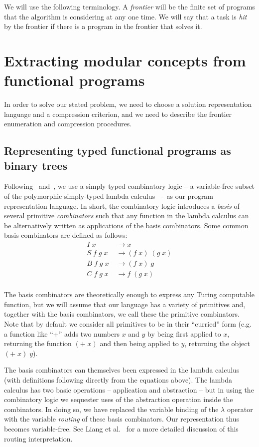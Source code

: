 \documentclass{article}
\begin{document}
We will use the following terminology. A \emph{frontier} will be the
finite set of programs that the algorithm is considering at any one
time. We will say that a task is \emph{hit} by the frontier if there
is a program in the frontier that solves it. 

\section{Extracting modular concepts from functional programs}

In order to solve our stated problem, we need to choose a solution
representation language and a compression criterion, and we need to
describe the frontier enumeration and compression procedures.

\subsection{Representing typed functional programs as binary trees}

Following~\cite{liang10programs} and~\cite{Briggs:2008}, we use a
simply typed combinatory logic -- a variable-free subset of the
polymorphic simply-typed lambda calculus~\cite{Pierce_2002} -- as our
program representation language. In short, the combinatory logic
introduces a \emph{basis} of several primitive \emph{combinators} such
that any function in the lambda calculus can be alternatively written
as applications of the basis combinators. Some common basis
combinators are defined as follows:
\begin{align}
I\; x &\rightarrow  x \\
S\; f\; g\; x\; &\rightarrow (f\; x)\; (g\; x) \\ 
B\; f\; g\; x\; &\rightarrow (f\; x)\; g \\ 
C\; f\; g\; x\; &\rightarrow f\; (g\; x) \\ 
\end{align}

The basis combinators are theoretically enough to express any Turing
computable function, but we will assume that our language has a
variety of primitives and, together with the basis combinators, we
call these the primitive combinators. Note that by default we consider
all primitives to be in their ``curried'' form (e.g. a function like
``+'' adds two numbers $x$ and $y$ by being first applied to $x$,
returning the function $(+\;x)$ and then being applied to $y$,
returning the object $(+\;x)\;y$).

The basis combinators can themselves been expressed in the lambda
calculus (with definitions following directly from the equations
above). The lambda calculus has two basic operations -- application
and abstraction -- but in using the combinatory logic we sequester
uses of the abstraction operation inside the combinators. In doing so,
we have replaced the variable binding of the $\lambda$ operator with
the variable \emph{routing} of these basis combinators. Our
representation thus becomes variable-free. See Liang et
al.~\cite{liang10programs} for a more detailed discussion of this
routing interpretation.
\end{document}
